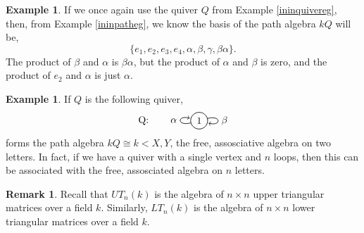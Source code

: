 \documentclass[11.5pt, twoside, a4paper, titlepage]{report}
\theoremstyle{definition}
\newtheorem{rem}[mydef]{Remark}
\newtheorem{eg}[mydef]{Example}
\theoremstyle{plain}
\begin{document}
\begin{eg}
If we once again use the quiver $Q$ from Example \ref{ininquivereg}, then, from Example \ref{ininpatheg}, we know the basis of the path algebra $kQ$ will be,
\begin{equation*}
\{e_1, e_2, e_3, e_4,\alpha, \beta, \gamma, \beta\alpha\}.
\end{equation*}
The product of $\beta$ and $\alpha$ is $\beta\alpha$, but the product of $\alpha$ and $\beta$ is zero, and the product of $e_2$ and $\alpha$ is just $\alpha$.
\end{eg}

\begin{eg}
If $Q$ is the following quiver,
\begin{equation*}
\begin{tikzpicture}[->,-latex, auto, every path/.style={->, semithick}, main node/.style={draw, circle}]
\node []			(0) at (-2,0)		{Q:};
\node	[main node]		(1) at (0,0)		{1};

\draw (1) edge[loop left] node [auto] {$\alpha$} (1);
\draw (1) edge [loop right] node [auto] {$\beta$} (1);
\end{tikzpicture}
\end{equation*}
forms the path algebra $kQ\cong k<X, Y$, the free, assosciative algebra on two letters. In fact, if we have a quiver with a single vertex and $n$ loops, then this can be associated with the free, assosciated algebra on $n$ letters.
\end{eg}

\begin{rem}
Recall that $UT_n(k)$ is the algebra of $n\times n$ upper triangular matrices over a field $k$. Similarly, $LT_n(k)$ is the algebra of $n\times n$ lower triangular matrices over a field $k$.
\end{rem}
\end{document}
